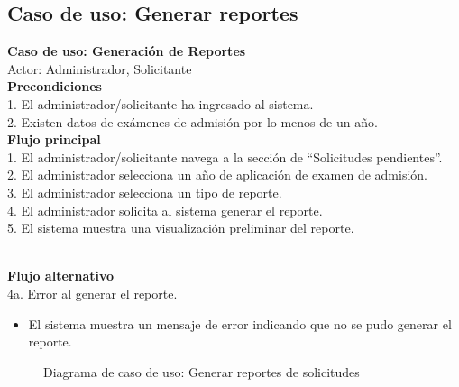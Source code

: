 \documentclass[12pt,a4paper]{article}
\begin{document}
\subsection{Caso de uso: Generar reportes}

\begin{tcolorbox}[colback=white, colframe=black, rounded corners]
  {\Large \textbf{Caso de uso: Generación de Reportes}} \\
  {\large Actor: Administrador, Solicitante} \vspace*{0.5cm} \\
  {{\large \textbf{Precondiciones}} \\
  1. El administrador/solicitante ha ingresado al sistema. \\
  2. Existen datos de exámenes de admisión por lo menos de un año.
  } \vspace*{0.5cm} \\
  {{\large \textbf{Flujo principal}} \\
  1. El administrador/solicitante navega a la sección de ``Solicitudes pendientes''. \\
  2. El administrador selecciona un año de aplicación de examen de admisión. \\
  3. El administrador selecciona un tipo de reporte. \\
  4. El administrador solicita al sistema generar el reporte. \\
  5. El sistema muestra una visualización preliminar del reporte. \\
  } \vspace*{0.5cm} \\
  {{\large \textbf{Flujo alternativo}} \\
  4a. Error al generar el reporte.
  \begin{itemize}
    \item El sistema muestra un mensaje de error indicando que no se pudo generar el reporte.
  \end{itemize}
}
\end{tcolorbox}

\begin{figure}[H]
  \centering
  \caption{Diagrama de caso de uso: Generar reportes de solicitudes}
  \label{fig:diagusoGenerarReportes}
\end{figure}
\end{document}
